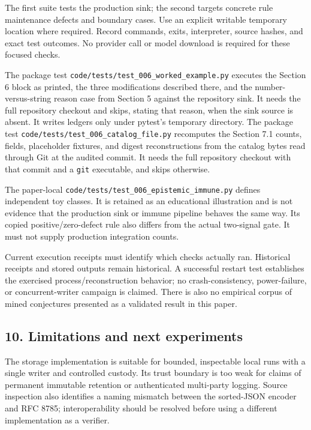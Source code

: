\documentclass[
  11pt,
]{article}
\newcommand{\passthrough}[1]{#1}
\begin{document}
The first suite tests the production sink; the second targets concrete
rule maintenance defects and boundary cases. Use an explicit writable
temporary location where required. Record commands, exits, interpreter,
source hashes, and exact test outcomes. No provider call or model
download is required for these focused checks.

The package test \nolinkurl{code/tests/test_006_worked_example.py}
executes the Section 6 block as printed, the three modifications
described there, and the number-versus-string reason case from Section 5
against the repository sink. It needs the full repository checkout and
skips, stating that reason, when the sink source is absent. It writes
ledgers only under pytest's temporary directory. The package test
\nolinkurl{code/tests/test_006_catalog_file.py} recomputes the Section
7.1 counts, fields, placeholder fixtures, and digest reconstructions
from the catalog bytes read through Git at the audited commit. It needs
the full repository checkout with that commit and a
\passthrough{\lstinline!git!} executable, and skips otherwise.

The paper-local \nolinkurl{code/tests/test_006_epistemic_immune.py}
defines independent toy classes. It is retained as an educational
illustration and is not evidence that the production sink or immune
pipeline behaves the same way. Its copied positive/zero-defect rule also
differs from the actual two-signal gate. It must not supply production
integration counts.

Current execution receipts must identify which checks actually ran.
Historical receipts and stored outputs remain historical. A successful
restart test establishes the exercised process/reconstruction behavior;
no crash-consistency, power-failure, or concurrent-writer campaign is
claimed. There is also no empirical corpus of mined conjectures
presented as a validated result in this paper.

\subsection{10. Limitations and next
experiments}\label{limitations-and-next-experiments}

The storage implementation is suitable for bounded, inspectable local
runs with a single writer and controlled custody. Its trust boundary is
too weak for claims of permanent immutable retention or authenticated
multi-party logging. Source inspection also identifies a naming mismatch
between the sorted-JSON encoder and RFC 8785; interoperability should be
resolved before using a different implementation as a verifier.
\end{document}
